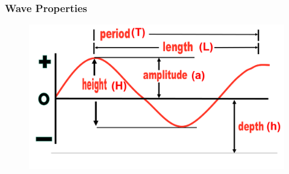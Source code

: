 \documentclass[7pt]{beamer}
\begin{document}
\begin{frame}
\frametitle{Wave Properties}
\begin{figure}[flowchart]
\includegraphics[width=1.0\linewidth]{img/Wave.jpg}\hfill
\end{figure}

\end{frame}
\end{document}
